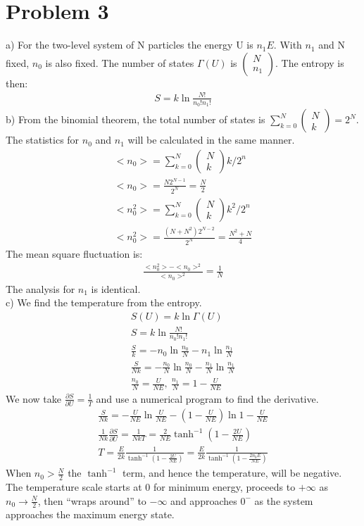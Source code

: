\documentclass[a4paper,10pt]{article}
\numberwithin{equation}{section}
\begin{document}
\section{Problem 3}
a) For the two-level system of N particles the energy U is $n_1E$. 
With $n_1$ and N fixed, $n_0$ is also fixed.
The number of states $\Gamma(U)$ is $\left(\substack{N\\n_1}\right)$.
The entropy is then:
\begin{gather}
 S=k\ln{\frac{N!}{n_0!n_1!}}
\end{gather}
b) From the binomial theorem, the total number of states is $\sum_{k=0}^N \left(\substack{N\\k}\right)=2^N$.
The statistics for $n_0$ and $n_1$ will be calculated in the same manner.
\begin{gather}
 <n_0>=\sum_{k=0}^N \left(\substack{N\\k}\right)k / 2^n\\
 <n_0>=\frac{N2^{N-1}}{2^N}=\frac{N}{2}\\
 <n_0^2>=\sum_{k=0}^N \left(\substack{N\\k}\right)k^2 / 2^n\\
 <n_0^2>=\frac{(N+N^2)2^{N-2}}{2^N}=\frac{N^2+N}{4}
\end{gather}
The mean square fluctuation is:
\begin{gather}
 \frac{<n_0^2>-<n_0>^2}{<n_0>^2}=\frac{1}{N}
\end{gather}
The analysis for $n_1$ is identical.
\\
c) We find the temperature from the entropy.
\begin{gather}
 S(U)=k\ln{\Gamma(U)}\\
 S=k\ln{\frac{N!}{n_0!n_1!}}\\
 \frac{S}{k}=-n_0\ln{\frac{n_0}{N}}-n_1\ln{\frac{n_1}{N}}\\
 \frac{S}{Nk}=-\frac{n_0}{N}\ln{\frac{n_0}{N}}-\frac{n_1}{N}\ln{\frac{n_1}{N}}\\
 \frac{n_0}{N}=\frac{U}{NE},\ \frac{n_1}{N}=1-\frac{U}{NE}
\end{gather}
We now take $\frac{\partial S}{\partial U}=\frac{1}{T}$ and use a numerical program to find the derivative.
\begin{gather}
 \frac{S}{Nk}=-\frac{U}{NE}\ln{\frac{U}{NE}}-(1-\frac{U}{NE})\ln{1-\frac{U}{NE}}\\
 \frac{1}{Nk}\frac{\partial S}{\partial U}=\frac{1}{NkT}=\frac{2}{NE}\tanh^{-1}{(1-\frac{2U}{NE})}\\
 T=\frac{E}{2k}\frac{1}{\tanh^{-1}{(1-\frac{2U}{NE})}}=\frac{E}{2k}\frac{1}{\tanh^{-1}{(1-\frac{2n_0E}{NE})}}
\end{gather}
When $n_0>\frac{N}{2}$ the $\tanh^{-1}$ term, and hence the temperature, will be negative. 
The temperature scale starts at 0 for minimum energy, proceeds to $+\infty$ as $n_0 \rightarrow \frac{N}{2}$,
then ``wraps around'' to $-\infty$ and approaches $0^-$ as the system approaches the maximum energy state.
\end{document}
